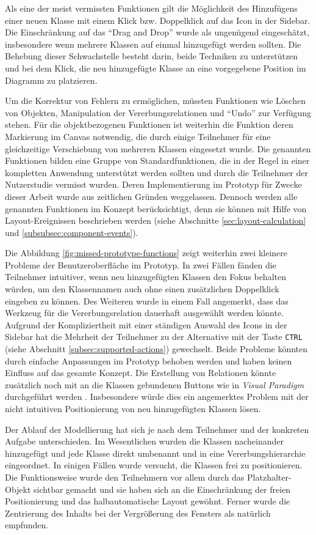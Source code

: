 Als eine der meist vermissten Funktionen gilt die Möglichkeit des Hinzufügens einer neuen Klasse mit einem Klick bzw. Doppelklick auf das Icon in der Sidebar. Die Einschränkung auf das \enquote{Drag and Drop} wurde als ungenügend eingeschätzt, insbesondere wenn mehrere Klassen auf einmal hinzugefügt werden sollten. Die Behebung dieser Schwachstelle besteht darin, beide Techniken zu unterstützen und bei dem Klick, die neu hinzugefügte Klasse an eine vorgegebene Position im Diagramm zu platzieren.

Um die Korrektur von Fehlern zu ermöglichen, müssten Funktionen wie Löschen von Objekten, Manipulation der Vererbungsrelationen und \enquote{Undo} zur Verfügung stehen. Für die objektbezogenen Funktionen ist weiterhin die Funktion deren Markierung im Canvas notwendig, die durch einige Teilnehmer für eine gleichzeitige Verschiebung von mehreren Klassen eingesetzt wurde. Die genannten Funktionen bilden eine Gruppe von Standardfunktionen, die in der Regel in einer kompletten Anwendung unterstützt werden sollten und durch die Teilnehmer der Nutzerstudie vermisst wurden. Deren Implementierung im Prototyp für Zwecke dieser Arbeit wurde aus zeitlichen Gründen weggelassen. Dennoch werden alle genannten Funktionen im Konzept berücksichtigt, denn sie können mit Hilfe von Layout-Ereignissen beschrieben werden (siehe Abschnitte \ref{sec:layout-calculation} und \ref{subsubsec:component-events}).

Die Abbildung \ref{fig:missed-prototype-functions} zeigt weiterhin zwei kleinere Probleme der Benutzeroberfläche im Prototyp. In zwei Fällen fänden die Teilnehmer intuitiver, wenn neu hinzugefügten Klassen den Fokus behalten würden, um den Klassennamen auch ohne einen zusätzlichen Doppelklick eingeben zu können. Des Weiteren wurde in einem Fall angemerkt, dass das Werkzeug für die Vererbungsrelation dauerhaft ausgewählt werden könnte. Aufgrund der Kompliziertheit mit einer ständigen Auswahl des Icons in der Sidebar hat die Mehrheit der Teilnehmer zu der Alternative mit der Taste \texttt{CTRL} (siehe Abschnitt \ref{subsec:supported-actions}) gewechselt. Beide Probleme könnten durch einfache Anpassungen im Prototyp behoben werden und haben keinen Einfluss auf das gesamte Konzept. Die Erstellung von Relationen könnte zusätzlich noch mit an die Klassen gebundenen Buttons wie in \textit{Visual Paradigm} durchgeführt werden \cite{14Visual}. Insbesondere würde dies ein angemerktes Problem mit der nicht intuitiven Positionierung von neu hinzugefügten Klassen lösen.

Der Ablauf der Modellierung hat sich je nach dem Teilnehmer und der konkreten Aufgabe unterschieden. Im Wesentlichen wurden die Klassen nacheinander hinzugefügt und jede Klasse direkt umbenannt und in eine Vererbungshierarchie eingeordnet. In einigen Fällen wurde versucht, die Klassen frei zu positionieren. Die Funktionsweise wurde den Teilnehmern vor allem durch das Platzhalter-Objekt sichtbar gemacht und sie haben sich an die Einschränkung der freien Positionierung und das halbautomatische Layout gewöhnt. Ferner wurde die Zentrierung des Inhalts bei der Vergrößerung des Fensters als natürlich empfunden.

